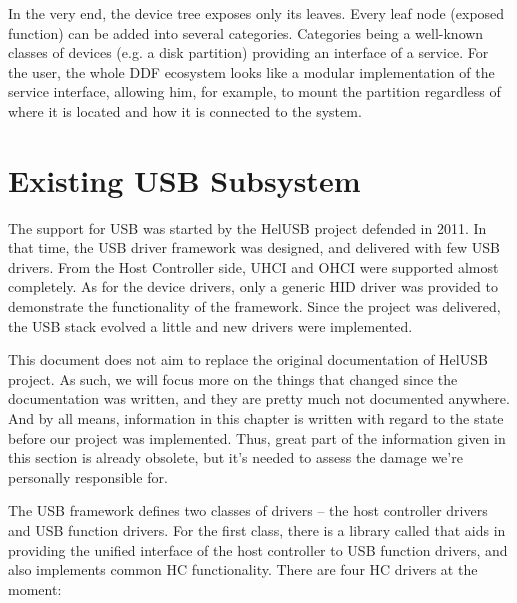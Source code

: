 In the very end, the device tree exposes only its leaves. Every leaf node
(exposed function) can be added into several categories. Categories being
a well-known classes of devices (e.g. a disk partition) providing an interface
of a service. For the user, the whole DDF ecosystem looks like a modular
implementation of the service interface, allowing him, for example, to mount
the partition regardless of where it is located and how it is connected to the
system.



\section{Existing USB Subsystem}

The support for USB was started by the HelUSB project defended in 2011. In that
time, the USB driver framework was designed, and delivered with few USB
drivers. From the Host Controller side, UHCI and OHCI were supported almost
completely. As for the device drivers, only a generic HID driver was provided
to demonstrate the functionality of the framework. Since the project was
delivered, the USB stack evolved a little and new drivers were implemented.

This document does not aim to replace the original documentation of HelUSB
project. As such, we will focus more on the things that changed since the
documentation was written, and they are pretty much not documented anywhere.
And by all means, information in this chapter is written with regard to the
state before our project was implemented. Thus, great part of the information
given in this section is already obsolete, but it's needed to assess the damage
we're personally responsible for.

The USB framework defines two classes of drivers -- the host controller drivers
and USB function drivers. For the first class, there is a library called
 that aids in providing the unified interface of the host
controller to USB function drivers, and also implements common HC
functionality. There are four HC drivers at the moment:

